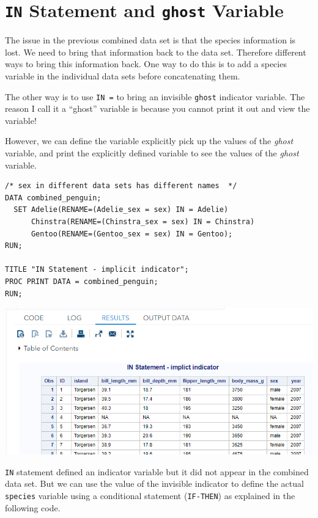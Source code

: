 \documentclass[
]{book}
\begin{document}
\hypertarget{in-statement-and-ghost-variable}{%
\section{\texorpdfstring{\texttt{IN} Statement and \texttt{ghost} Variable}{IN Statement and ghost Variable}}\label{in-statement-and-ghost-variable}}

The issue in the previous combined data set is that the species information is lost. We need to bring that information back to the data set. Therefore different ways to bring this information back. One way to do this is to add a species variable in the individual data sets before concatenating them.

The other way is to use \texttt{IN\ =} to bring an invisible \texttt{ghost} indicator variable. The reason I call it a ``ghost'' variable is because you cannot print it out and view the variable!

However, we can define the variable explicitly pick up the values of the \emph{ghost} variable, and print the explicitly defined variable to see the values of the \emph{ghost} variable.

\begin{verbatim}
/* sex in different data sets has different names  */
DATA combined_penguin;
  SET Adelie(RENAME=(Adelie_sex = sex) IN = Adelie)
      Chinstra(RENAME=(Chinstra_sex = sex) IN = Chinstra)
      Gentoo(RENAME=(Gentoo_sex = sex) IN = Gentoo);
RUN; 

TITLE "IN Statement - implicit indicator";
PROC PRINT DATA = combined_penguin;
RUN;
\end{verbatim}

\begin{center}\includegraphics[width=1\linewidth]{img08/w08-IN-invisibleIndicator} \end{center}

\texttt{IN} statement defined an indicator variable but it did not appear in the combined data set. But we can use the value of the invisible indicator to define the actual \texttt{species} variable using a conditional statement (\texttt{IF-THEN}) as explained in the following code.
\end{document}
